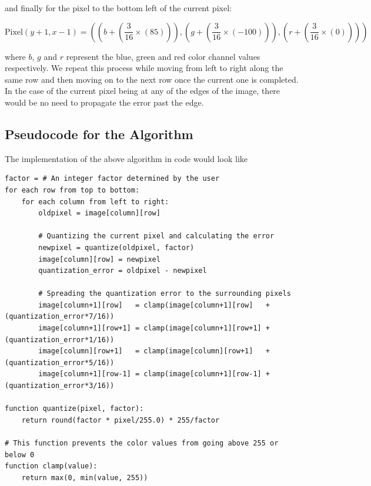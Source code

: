 \documentclass{article}
\begin{document}
\noindent and finally for the pixel to the bottom left of the current pixel:

$$
    \text{Pixel}(y+1,x-1) = \left(\left(b+\left(\frac{3}{16}\times(85)\right)\right),\left(g+\left(\frac{3}{16}\times(-100)\right)\right),\left(r+\left(\frac{3}{16}\times(0)\right)\right)\right)
$$

\noindent where $b$, $g$ and $r$ represent the blue, green and red color channel values respectively. We repeat this process while moving from left to right along the same row and then moving on to the next row once the current one is completed. In the case of the current pixel being at any of the edges of the image, there would be no need to propagate the error past the edge.

\subsection{Pseudocode for the Algorithm}\label{Floyd-Steinberg Pseudocode}

The implementation of the above algorithm in code would look like

\begin{verbatim}
factor = # An integer factor determined by the user
for each row from top to bottom:
    for each column from left to right:
        oldpixel = image[column][row]

        # Quantizing the current pixel and calculating the error
        newpixel = quantize(oldpixel, factor)
        image[column][row] = newpixel
        quantization_error = oldpixel - newpixel

        # Spreading the quantization error to the surrounding pixels
        image[column+1][row]   = clamp(image[column+1][row]   + (quantization_error*7/16))
        image[column+1][row+1] = clamp(image[column+1][row+1] + (quantization_error*1/16))
        image[column][row+1]   = clamp(image[column][row+1]   + (quantization_error*5/16))
        image[column+1][row-1] = clamp(image[column+1][row-1] + (quantization_error*3/16))

function quantize(pixel, factor):
    return round(factor * pixel/255.0) * 255/factor

# This function prevents the color values from going above 255 or below 0
function clamp(value):
    return max(0, min(value, 255))
\end{verbatim}
\end{document}
